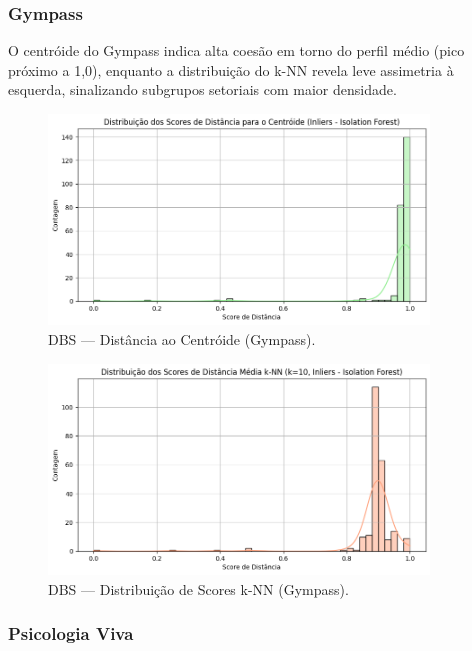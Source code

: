 \subsubsection*{Gympass}
\noindent
O centróide do Gympass indica alta coesão em torno do perfil médio (pico próximo a 1,0), enquanto a distribuição do k-NN revela leve assimetria à esquerda, sinalizando subgrupos setoriais com maior densidade.

\begin{figure}[H]
    \centering
    \includegraphics[width=0.9\textwidth]{imagens/gympass_centroid.png}
    \caption{DBS — Distância ao Centróide (Gympass).}
    \label{fig:gympass_centroid}
\end{figure}

\begin{figure}[H]
    \centering
    \includegraphics[width=0.9\textwidth]{imagens/gympass_knn.png}
    \caption{DBS — Distribuição de Scores k-NN (Gympass).}
    \label{fig:gympass_knn}
\end{figure}

\subsubsection*{Psicologia Viva}

